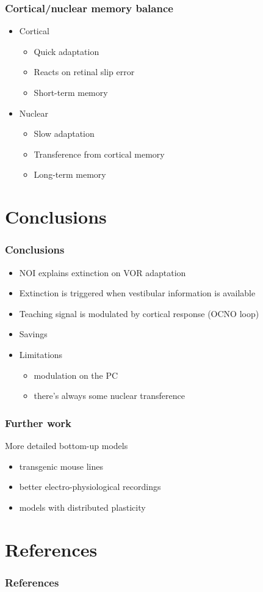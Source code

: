 \documentclass[10pt, compress]{beamer}
\begin{document}
\begin{frame}[fragile]
  \frametitle{Cortical/nuclear memory balance}
  \begin{itemize}
    \item Cortical
      \begin{itemize}
        \item Quick adaptation
        \item Reacts on retinal slip error
        \item Short-term memory
      \end{itemize}
    \item Nuclear
      \begin{itemize}
        \item Slow adaptation
        \item Transference from cortical memory
        \item Long-term memory
      \end{itemize}
  \end{itemize}
\end{frame}


\section{Conclusions}


\begin{frame}[fragile]
  \frametitle{Conclusions}
  \begin{itemize}
    \item NOI explains extinction on VOR adaptation
    \item Extinction is triggered when vestibular information is available
    \item Teaching signal is modulated by cortical response (OCNO loop)
    \item Savings
    \item Limitations
    \begin{itemize}
      \item modulation on the PC
      \item there's always some nuclear transference
    \end{itemize}
  \end{itemize}
\end{frame}


\begin{frame}[fragile]
  \frametitle{Further work}
  More detailed bottom-up models
  \begin{itemize}
    \item transgenic mouse lines
    \item better electro-physiological recordings
    \item models with distributed plasticity
  \end{itemize}
\end{frame}


\section{References}


\begin{frame}[fragile]
  \frametitle{References}
  
\end{frame}


\end{document}
